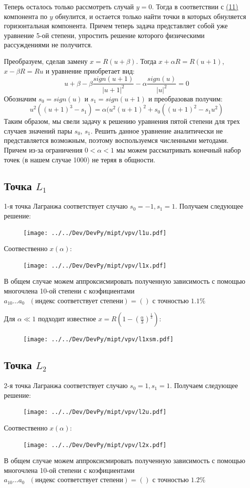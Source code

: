 \documentclass[a4paper]{article} %
\begin{document}
Теперь осталось только рассмотреть случай $y=0$. Тогда в соответствии с \hyperref[11]{(11)} компонента по $y$ обнулится, и остается только найти точки в которых обнуляется горизонтальная компонента. Причем теперь задача представляет собой уже уравнение 5-ой степени, упростить решение которого физическими рассуждениями не получится.

Преобразуем, сделав замену $x = R(u + \beta)$. Тогда $x + \alpha R = R(u+1)$, $x - \beta R = Ru$ и уравнение приобретает вид:
\begin{equation}
u + \beta - \beta\frac{sign(u+1)}{|u+1|^2} - \alpha\frac{sign(u)}{|u|^2} = 0
\end{equation}
Обозначим $s_0 = sign(u)$ и $s_1 = sign(u+1)$ и преобразовав получим:
\begin{equation}
u^2((u+1)^3 - s_1) = \alpha(u^2(u+1)^2 + s_0((u+1)^2 - s_1u^2)
\end{equation}
Таким образом, мы свели задачу к решению уравнения пятой степени для трех случаев значений пары $s_0$, $s_1$. Решить данное уравнение аналитически не представляется возможным, поэтому воспользуемся численными методами. Причем из-за ограничения $0 < \alpha < 1$ мы можем рассматривать конечный набор точек (в нашем случае 1000) не теряя в общности. 
\subsection{Точка $L_1$}
1-я точка Лагранжа соответствует случаю $s_0 = -1, s_1 = 1$. Получаем следующее решение:
\begin{figure}[H]
\texttt{[image: ../../Dev/DevPy/mipt/vpv/l1u.pdf]}
\end{figure}
Соотвественно $x(\alpha)$:
\begin{figure}[H]
\texttt{[image: ../../Dev/DevPy/mipt/vpv/l1x.pdf]} 
\end{figure}
В общем случае можем аппроксисмировать полученную зависимость с помощью многочлена 10-ой степени с коэфициентами $a_{10}...a_0 \text{ }(\text{индекс соответствует степени}) = ()$ с точностью $1.1\%$

Для $\alpha \ll 1$ подходит известное $x = R\left(1 - (\frac{\alpha}{3})^{\frac{1}{3}}\right)$:
\begin{figure}[H]
\texttt{[image: ../../Dev/DevPy/mipt/vpv/l1xsm.pdf]} 
\end{figure}

\subsection{Точка $L_2$}
2-я точка Лагранжа соответствует случаю $s_0 = 1, s_1 = 1$. Получаем следующее решение:
\begin{figure}[H]
\texttt{[image: ../../Dev/DevPy/mipt/vpv/l2u.pdf]}
\end{figure}
\pagebreak
Соотвественно $x(\alpha)$:
\begin{figure}[H]
\texttt{[image: ../../Dev/DevPy/mipt/vpv/l2x.pdf]} 
\end{figure}
В общем случае можем аппроксисмировать полученную зависимость с помощью многочлена 10-ой степени с коэфициентами $a_{10}...a_0 \text{ }(\text{индекс соответствует степени}) = ()$ с точностью $1.2\%$
\end{document}
